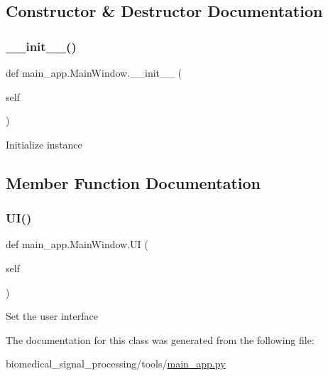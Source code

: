 \subsection{Constructor \& Destructor Documentation}
\mbox{\label{classmain__app_1_1MainWindow_a2a91845f7b97cfc7411a7b94833e8ea1}} 
\subsubsection{\texorpdfstring{\+\_\+\+\_\+init\+\_\+\+\_\+()}{\_\_init\_\_()}}
{\footnotesize\ttfamily def main\+\_\+app.\+Main\+Window.\+\_\+\+\_\+init\+\_\+\+\_\+ (\begin{DoxyParamCaption}\item[{}]{self }\end{DoxyParamCaption})}

\begin{DoxyVerb}Initialize instance
\end{DoxyVerb}
 

\subsection{Member Function Documentation}
\mbox{\label{classmain__app_1_1MainWindow_a1ef701ac0e322d763a7d23b8d7f95dba}} 
\subsubsection{\texorpdfstring{U\+I()}{UI()}}
{\footnotesize\ttfamily def main\+\_\+app.\+Main\+Window.\+UI (\begin{DoxyParamCaption}\item[{}]{self }\end{DoxyParamCaption})}

\begin{DoxyVerb}Set the user interface
\end{DoxyVerb}
 

The documentation for this class was generated from the following file\+:\begin{DoxyCompactItemize}
\item 
biomedical\+\_\+signal\+\_\+processing/tools/\hyperlink{main__app_8py}{main\+\_\+app.\+py}\end{DoxyCompactItemize}
